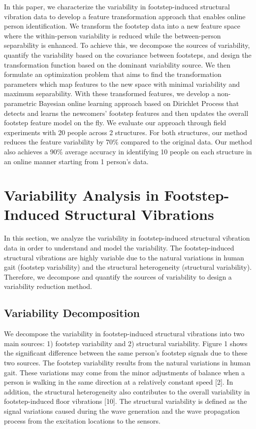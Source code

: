 \documentclass[11pt,letter]{article}
\begin{document}
\begin{multicols*}{2}
In this paper, we characterize the variability in footstep-induced structural vibration data to develop a feature transformation approach that enables online person identification. We transform the footstep data into a new feature space where the within-person variability is reduced while the between-person separability is enhanced. To achieve this, we decompose the sources of variability, quantify the variability based on the covariance between footsteps, and design the transformation function based on the dominant variability source. We then formulate an optimization problem that aims to find the transformation parameters which map features to the new space with minimal variability and maximum separability. With these transformed features, we develop a non-parametric Bayesian online learning approach based on Dirichlet Process that detects and learns the newcomers’ footstep features and then updates the overall footstep feature model on the fly. We evaluate our approach through field experiments with 20 people across 2 structures. For both structures, our method reduces the feature variability by 70\% compared to the original data. Our method also achieves a 90\% average accuracy in identifying 10 people on each structure in an online manner starting from 1 person's data.

\section{Variability Analysis in Footstep-Induced Structural Vibrations}
In this section, we analyze the variability in footstep-induced structural vibration data in order to understand and model the variability. The footstep-induced structural vibrations are highly variable due to the natural variations in human gait (footstep variability) and the structural heterogeneity (structural variability). Therefore, we decompose and quantify the sources of variability to design a variability reduction method.

\subsection{Variability Decomposition}
We decompose the variability in footstep-induced structural vibrations into two main sources: 1) footstep variability and 2) structural variability. Figure 1 shows the significant difference between the same person’s footstep signals due to these two sources. The footstep variability results from the natural variations in human gait. These variations may come from the minor adjustments of balance when a person is walking in the same direction at a relatively constant speed [2]. In addition, the structural heterogeneity also contributes to the overall variability in footstep-induced floor vibrations [10]. The structural variability is defined as the signal variations caused during the wave generation and the wave propagation process from the excitation locations to the sensors.


\end{multicols*}
\end{document}
